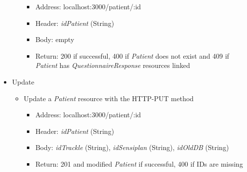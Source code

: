 \documentclass[
a4paper,
11pt
]{article}
\begin{document}
\begin{itemize}
\begin{itemize}
\begin{itemize}
				\item Address: localhost:3000/patient/:id
				\item Header: \textit{idPatient} (String)
				\item Body: empty
				\item Return: 200 if successful, 400 if \textit{Patient} does not exist and 409 if \textit{Patient} has \textit{QuestionnaireResponse} resources linked
			\end{itemize}
		\end{itemize}
		\item Update
		\begin{itemize}
			\item Update a \textit{Patient} resource with the \ac{HTTP}-PUT method
			\begin{itemize}
				\item Address: localhost:3000/patient/:id
				\item Header: \textit{idPatient} (String)
				\item Body: \textit{idTrackle} (String), \textit{idSensiplan} (String), \textit{idOldDB} (String)
				\item Return: 201 and modified \textit{Patient} if successful, 400 if IDs are missing
			\end{itemize}
		\end{itemize}
		
	\end{itemize}
	
\end{document}
